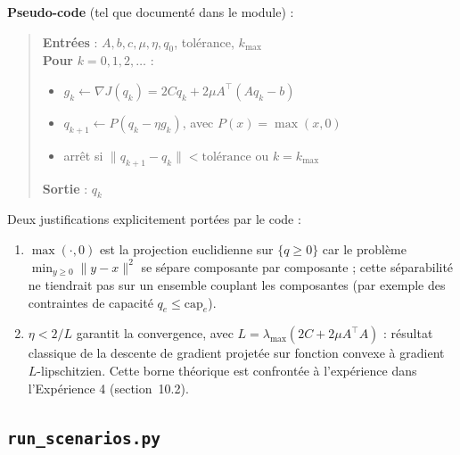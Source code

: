 \documentclass[11pt,a4paper]{article}
\begin{document}
\textbf{Pseudo-code} (tel que documenté dans le module) :

\begin{quote}
\textbf{Entrées} : $A, b, c, \mu, \eta, q_0$, tolérance, $k_{\max}$\\
\textbf{Pour} $k = 0, 1, 2, \dots$ :
\begin{itemize}
  \item $g_k \leftarrow \nabla J(q_k) = 2Cq_k + 2\mu A^\top(Aq_k - b)$
  \item $q_{k+1} \leftarrow P(q_k - \eta g_k)$, avec $P(x) = \max(x, 0)$
  \item arrêt si $\lVert q_{k+1} - q_k \rVert < \text{tolérance}$ ou $k =
  k_{\max}$
\end{itemize}
\textbf{Sortie} : $q_k$
\end{quote}

Deux justifications explicitement portées par le code :

\begin{enumerate}
  \item $\max(\cdot, 0)$ est la projection euclidienne sur $\{q \geq 0\}$
  car le problème $\min_{y \geq 0} \lVert y - x \rVert^2$ se sépare
  composante par composante ; cette séparabilité ne tiendrait pas sur un
  ensemble couplant les composantes (par exemple des contraintes de
  capacité $q_e \leq \text{cap}_e$).
  \item $\eta < 2/L$ garantit la convergence, avec $L = \lambda_{\max}(2C +
  2\mu A^\top A)$ : résultat classique de la descente de gradient projetée
  sur fonction convexe à gradient $L$-lipschitzien. Cette borne théorique
  est confrontée à l'expérience dans l'Expérience 4 (section~10.2).
\end{enumerate}

\subsection{\texttt{run\_scenarios.py}}
\end{document}
